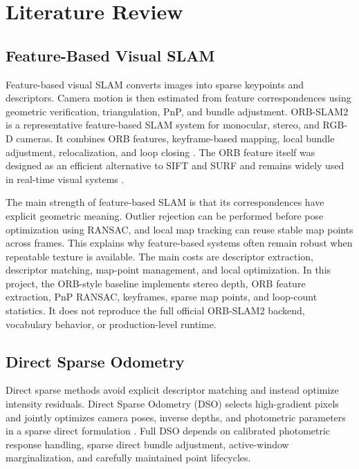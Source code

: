 \documentclass[11pt,a4paper]{article}
\begin{document}
\section{Literature Review}

\subsection{Feature-Based Visual SLAM}

Feature-based visual SLAM converts images into sparse keypoints and descriptors. Camera motion is then estimated from feature correspondences using geometric verification, triangulation, PnP, and bundle adjustment. ORB-SLAM2 is a representative feature-based SLAM system for monocular, stereo, and RGB-D cameras. It combines ORB features, keyframe-based mapping, local bundle adjustment, relocalization, and loop closing \cite{mur2017orbslam2}. The ORB feature itself was designed as an efficient alternative to SIFT and SURF and remains widely used in real-time visual systems \cite{rublee2011orb}.

The main strength of feature-based SLAM is that its correspondences have explicit geometric meaning. Outlier rejection can be performed before pose optimization using RANSAC, and local map tracking can reuse stable map points across frames. This explains why feature-based systems often remain robust when repeatable texture is available. The main costs are descriptor extraction, descriptor matching, map-point management, and local optimization. In this project, the ORB-style baseline implements stereo depth, ORB feature extraction, PnP RANSAC, keyframes, sparse map points, and loop-count statistics. It does not reproduce the full official ORB-SLAM2 backend, vocabulary behavior, or production-level runtime.

\subsection{Direct Sparse Odometry}

Direct sparse methods avoid explicit descriptor matching and instead optimize intensity residuals. Direct Sparse Odometry (DSO) selects high-gradient pixels and jointly optimizes camera poses, inverse depths, and photometric parameters in a sparse direct formulation \cite{engel2018dso}. Full DSO depends on calibrated photometric response handling, sparse direct bundle adjustment, active-window marginalization, and carefully maintained point lifecycles.
\end{document}

